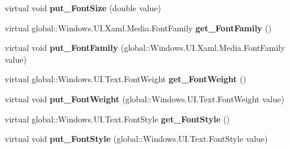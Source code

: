 \begin{DoxyCompactItemize}
\item 
\mbox{\label{class_windows_1_1_u_i_1_1_xaml_1_1_controls_1_1_control_af511651d84c62e096804d65532964059}} 
virtual void {\bfseries put\+\_\+\+Font\+Size} (double value)
\item 
\mbox{\label{class_windows_1_1_u_i_1_1_xaml_1_1_controls_1_1_control_ad993e612b853d9afcb875a5e4234fcc1}} 
virtual global\+::\+Windows.\+U\+I.\+Xaml.\+Media.\+Font\+Family {\bfseries get\+\_\+\+Font\+Family} ()
\item 
\mbox{\label{class_windows_1_1_u_i_1_1_xaml_1_1_controls_1_1_control_af2d5ee1323dfd2ae954b480a76f90bba}} 
virtual void {\bfseries put\+\_\+\+Font\+Family} (global\+::\+Windows.\+U\+I.\+Xaml.\+Media.\+Font\+Family value)
\item 
\mbox{\label{class_windows_1_1_u_i_1_1_xaml_1_1_controls_1_1_control_a7ebe7963613a80ab54042ed42d0fa16d}} 
virtual global\+::\+Windows.\+U\+I.\+Text.\+Font\+Weight {\bfseries get\+\_\+\+Font\+Weight} ()
\item 
\mbox{\label{class_windows_1_1_u_i_1_1_xaml_1_1_controls_1_1_control_acf14fc60ff1e6b2aacf2503e680ebc89}} 
virtual void {\bfseries put\+\_\+\+Font\+Weight} (global\+::\+Windows.\+U\+I.\+Text.\+Font\+Weight value)
\item 
\mbox{\label{class_windows_1_1_u_i_1_1_xaml_1_1_controls_1_1_control_a3083dad6568d1d20caa957d9a785e415}} 
virtual global\+::\+Windows.\+U\+I.\+Text.\+Font\+Style {\bfseries get\+\_\+\+Font\+Style} ()
\item 
\mbox{\label{class_windows_1_1_u_i_1_1_xaml_1_1_controls_1_1_control_a823b5b7960c23d5b8bb2f92876534959}} 
virtual void {\bfseries put\+\_\+\+Font\+Style} (global\+::\+Windows.\+U\+I.\+Text.\+Font\+Style value)
\item 
\mbox{\label{class_windows_1_1_u_i_1_1_xaml_1_1_controls_1_1_control_a8ded01d56e501532b1c98b68fa92f29f}} 

\end{DoxyCompactItemize}

